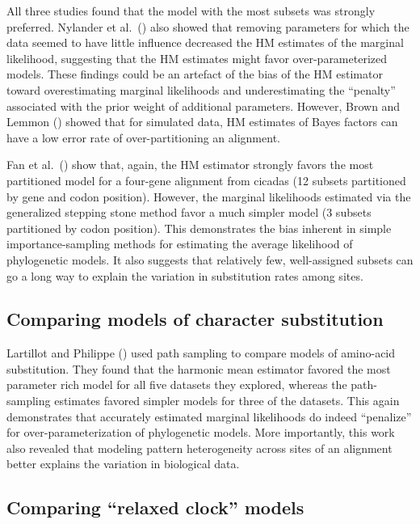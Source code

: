 All three studies found that the model with the most subsets was strongly
preferred.
Nylander et al.\ (\citeyear{NylanderEtal2004}) also showed that removing
parameters for which the data seemed to have little influence decreased the HM
estimates of the marginal likelihood, suggesting that the HM estimates might
favor over-parameterized models.
These findings could be an artefact of the bias of the HM estimator toward
overestimating marginal likelihoods and underestimating the ``penalty''
associated with the prior weight of additional parameters.
However, Brown and Lemmon (\citeyear{Brown2007}) showed that for simulated data,
HM estimates of Bayes factors can have a low error rate of over-partitioning an
alignment.

Fan et al.\ (\citeyear{Fan2011}) show that, again, the HM estimator strongly
favors the most partitioned model for a four-gene alignment from cicadas (12
subsets partitioned by gene and codon position).
However, the marginal likelihoods estimated via the generalized stepping stone
method favor a much simpler model (3 subsets partitioned by codon position).
This demonstrates the bias inherent in simple importance-sampling methods
for estimating the average likelihood of phylogenetic models.
It also suggests that relatively few, well-assigned subsets can go a long way
to explain the variation in substitution rates among sites.

\subsection{Comparing models of character substitution}

Lartillot and Philippe (\citeyear{Lartillot2006}) used path sampling to compare
models of amino-acid substitution.
They found that the harmonic mean estimator favored the most parameter rich
model for all five datasets they explored, whereas the path-sampling estimates
favored simpler models for three of the datasets.
This again demonstrates that accurately estimated marginal likelihoods do
indeed ``penalize'' for over-parameterization of phylogenetic models.
More importantly, this work also revealed that modeling pattern heterogeneity
across sites of an alignment better explains the variation in biological data.

\subsection{Comparing ``relaxed clock'' models}

